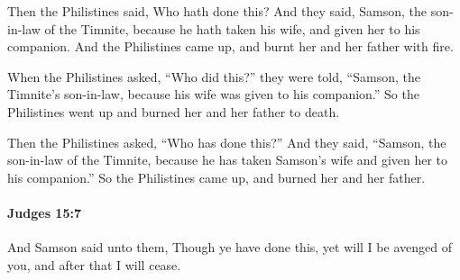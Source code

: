 			\begin{versebox}
					\item[BHS] 
					\item[ASV] Then the Philistines said, Who hath done this? And they said, Samson, the son-in-law of the Timnite, because he hath taken his wife, and given her to his companion. And the Philistines came up, and burnt her and her father with fire.
					\item[NIV] When the Philistines asked, “Who did this?” they were told, “Samson, the Timnite’s son-in-law, because his wife was given to his companion.” So the Philistines went up and burned her and her father to death.
					\item[NRSV] Then the Philistines asked, “Who has done this?” And they said, “Samson, the son-in-law of the Timnite, because he has taken Samson’s wife and given her to his companion.” So the Philistines came up, and burned her and her father.
			\end{versebox}

		\paragraph{Judges 15:7} %
			\label{JUDGES-15-7}

			And Samson said unto them, Though ye have done this, yet will I be avenged of you, and after that I will cease.


